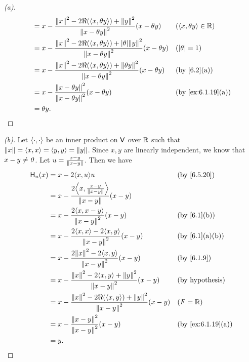 \begin{proof}[(a)]
\begin{align*}
                & = x - \frac{\norm{x}^2 - 2 \Re(\inn{x, \theta y}) + \norm{y}^2}{\norm{x - \theta y}^2} (x - \theta y)              &  & (\inn{x, \theta y} \in \R) \\
                & = x - \frac{\norm{x}^2 - 2 \Re(\inn{x, \theta y}) + \abs{\theta} \norm{y}^2}{\norm{x - \theta y}^2} (x - \theta y) &  & (\abs{\theta} = 1)         \\
                & = x - \frac{\norm{x}^2 - 2 \Re(\inn{x, \theta y}) + \norm{\theta y}^2}{\norm{x - \theta y}^2} (x - \theta y)       &  & \by{6.2}[a]                \\
                & = x - \frac{\norm{x - \theta y}^2}{\norm{x - \theta y}^2} (x - \theta y)                                           &  & \by{ex:6.1.19}[a]          \\
                & = \theta y.
  \end{align*}
\end{proof}

\begin{proof}[(b)]
  Let \(\left\langle\cdot, \cdot\right\rangle\) be an inner product on \(\mathsf{V}\) over \(\mathbb{R}\) such that \(\left\lVert x\right\rVert = \left\langle x, x\right\rangle = \left\langle y, y\right\rangle = \left\lVert y\right\rVert\).
  Since \(x, y\) are linearly independent, we know that \(x - y \neq \mathit{0}\).
  Let \(u = \frac{x - y}{\left\lVert x- y\right\rVert}\).
  Then we have
  \begin{align*}
    \lt{H}_u(x) & = x - 2 \inn{x, u} u                                                             &  & \by{6.5.20}            \\
                & = x - \frac{2 \inn{x, \frac{x - y}{\norm{x - y}}}}{\norm{x - y}} (x - y)                                     \\
                & = x - \frac{2 \inn{x, x - y}}{\norm{x - y}^2} (x - y)                            &  & \by{6.1}[b]            \\
                & = x - \frac{2 \inn{x, x} - 2 \inn{x, y}}{\norm{x - y}^2} (x - y)                 &  & \by{6.1}[a,b]          \\
                & = x - \frac{2 \norm{x}^2 - 2 \inn{x, y}}{\norm{x - y}^2} (x - y)                 &  & \by{6.1.9}             \\
                & = x - \frac{\norm{x}^2 - 2 \inn{x, y} + \norm{y}^2}{\norm{x - y}^2} (x - y)      &  & \text{(by hypothesis)} \\
                & = x - \frac{\norm{x}^2 - 2 \Re(\inn{x, y}) + \norm{y}^2}{\norm{x - y}^2} (x - y) &  & (\F = \R)              \\
                & = x - \frac{\norm{x - y}^2}{\norm{x - y}^2} (x - y)                              &  & \by{ex:6.1.19}[a]      \\
                & = y.
  \end{align*}
\end{proof}
